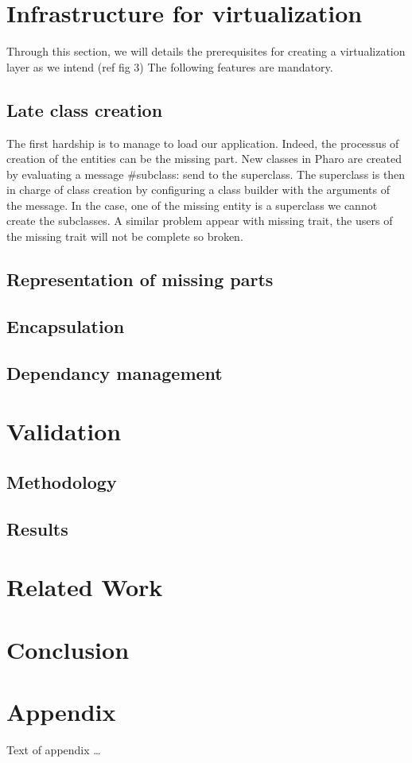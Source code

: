 \documentclass[sigplan,review,anonymous]{acmart}\settopmatter{printfolios=true,printccs=false,printacmref=false}
\begin{document}
%
\section{Infrastructure for virtualization}
Through this section, we will details the prerequisites for creating a virtualization layer as we intend (ref fig 3)
The following features are mandatory.
\subsection{Late class creation}
The first hardship is to manage to load our application.
Indeed, the processus of creation of the entities can be the missing part.  
New classes in Pharo are created by evaluating a message \#subclass: send to the superclass.
The superclass is then in charge of class creation by configuring a class builder with the arguments of the message.
In the case, one of the missing entity is a superclass we cannot create the subclasses.
A similar problem appear with missing trait, the users of the missing trait will not be complete so broken.


\subsection{Representation of missing parts}
\subsection{Encapsulation}
\subsection{Dependancy management}

\section{Validation}

\subsection{Methodology}

\subsection{Results}

\section{Related Work}

\section{Conclusion}

\appendix
\section{Appendix}

Text of appendix \ldots
\end{document}

